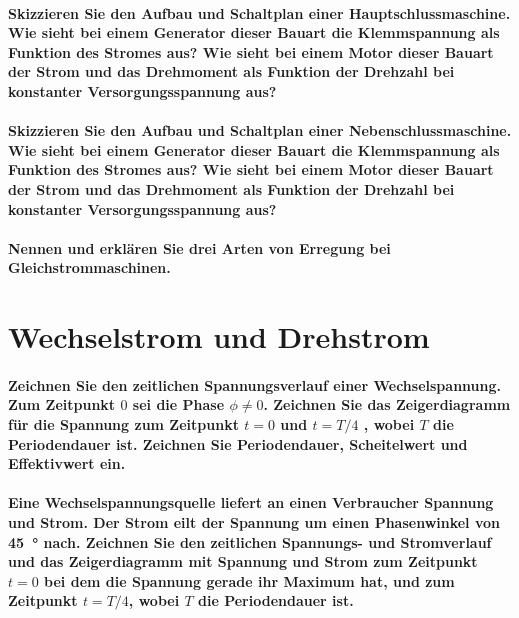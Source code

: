 \documentclass[a4paper, 11pt, parskip=half]{scrartcl}
\begin{document}
\paragraph{Skizzieren Sie den Aufbau und Schaltplan einer Hauptschlussmaschine. Wie sieht bei einem
Generator dieser Bauart die Klemmspannung als Funktion des Stromes aus? Wie sieht bei einem Motor
dieser Bauart der Strom und das Drehmoment als Funktion der Drehzahl bei konstanter
Versorgungsspannung aus?}

\paragraph{Skizzieren Sie den Aufbau und Schaltplan einer Nebenschlussmaschine. Wie sieht bei einem
Generator dieser Bauart die Klemmspannung als Funktion des Stromes aus? Wie sieht bei einem Motor
dieser Bauart der Strom und das Drehmoment als Funktion der Drehzahl bei konstanter
Versorgungsspannung aus?}

\paragraph{Nennen und erklären Sie drei Arten von Erregung bei Gleichstrommaschinen.}

\newpage

\section{Wechselstrom und Drehstrom}

\paragraph{Zeichnen Sie den zeitlichen Spannungsverlauf einer Wechselspannung. Zum Zeitpunkt $0$ sei
die Phase $\phi \neq 0$. Zeichnen Sie das Zeigerdiagramm für die Spannung zum Zeitpunkt $t=0$ und
$t=T/4$ , wobei $T$ die Periodendauer ist. Zeichnen Sie Periodendauer, Scheitelwert und Effektivwert
ein.}

\paragraph{Eine Wechselspannungsquelle liefert an einen Verbraucher Spannung und Strom. Der Strom
eilt der Spannung um einen Phasenwinkel von \SI{45}{\degree} nach. Zeichnen Sie den zeitlichen
Spannungs- und Stromverlauf und das Zeigerdiagramm mit Spannung und Strom zum Zeitpunkt $t=0$ bei
dem die Spannung gerade ihr Maximum hat, und zum Zeitpunkt $t=T/4$, wobei $T$ die Periodendauer
ist.}
\end{document}
